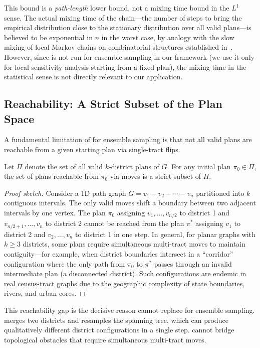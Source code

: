 \begin{remark}
This bound is a \emph{path-length} lower bound, not a mixing time bound in the
$L^1$ sense.
The actual mixing time of the \flip{} chain---the number of steps to bring
the empirical distribution close to the stationary distribution over all
valid plans---is believed to be exponential in $n$ in the worst case, by
analogy with the slow mixing of local Markov chains on combinatorial
structures established in~\citet{sinclair1992}.
However, since \flip{} is not run for ensemble sampling in our framework
(we use it only for local sensitivity analysis starting from a fixed plan),
the mixing time in the statistical sense is not directly relevant to our
application.
\end{remark}

\subsection{Reachability: A Strict Subset of the Plan Space}
\label{subsec:reachability}

A fundamental limitation of \flip{} for ensemble sampling is that not all
valid plans are reachable from a given starting plan via single-tract flips.

\begin{theorem}
\label{thm:reachability}
Let $\Pi$ denote the set of all valid $k$-district plans of $G$.
For any initial plan $\pi_0 \in \Pi$, the set of plans reachable from
$\pi_0$ via \flip{} moves is a strict subset of $\Pi$.
\end{theorem}

\begin{proof}[Proof sketch]
Consider a 1D path graph $G = v_1 - v_2 - \cdots - v_n$ partitioned into
$k$ contiguous intervals.
The only valid \flip{} moves shift a boundary between two adjacent intervals
by one vertex.
The plan $\pi_0$ assigning $v_1, \ldots, v_{n/2}$ to district 1 and
$v_{n/2+1}, \ldots, v_n$ to district 2 cannot be reached from the plan
$\pi^*$ assigning $v_1$ to district 2 and $v_2, \ldots, v_n$ to district 1
in one step.
In general, for planar graphs with $k \geq 3$ districts, some plans require
simultaneous multi-tract moves to maintain contiguity---for example, when
district boundaries intersect in a ``corridor'' configuration where the only
path from $\pi_0$ to $\pi^*$ passes through an invalid intermediate plan
(a disconnected district).
Such configurations are endemic in real census-tract graphs due to the
geographic complexity of state boundaries, rivers, and urban cores.
\end{proof}

This reachability gap is the decisive reason \flip{} cannot replace \recom{}
for ensemble sampling.
\recom{} merges two districts and resamples the spanning tree, which can
produce qualitatively different district configurations in a single step.
\flip{} cannot bridge topological obstacles that require simultaneous
multi-tract moves.
